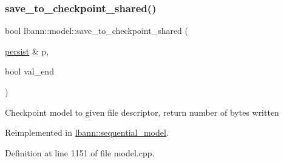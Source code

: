 \subsubsection{\texorpdfstring{save\+\_\+to\+\_\+checkpoint\+\_\+shared()}{save\_to\_checkpoint\_shared()}}
{\footnotesize\ttfamily bool lbann\+::model\+::save\+\_\+to\+\_\+checkpoint\+\_\+shared (\begin{DoxyParamCaption}\item[{\hyperlink{classlbann_1_1persist}{persist} \&}]{p,  }\item[{bool}]{val\+\_\+end }\end{DoxyParamCaption})\hspace{0.3cm}{\ttfamily [virtual]}}

Checkpoint model to given file descriptor, return number of bytes written 

Reimplemented in \hyperlink{classlbann_1_1sequential__model_a226032d9890b8770c6fca54bf70d69eb}{lbann\+::sequential\+\_\+model}.



Definition at line 1151 of file model.\+cpp.


